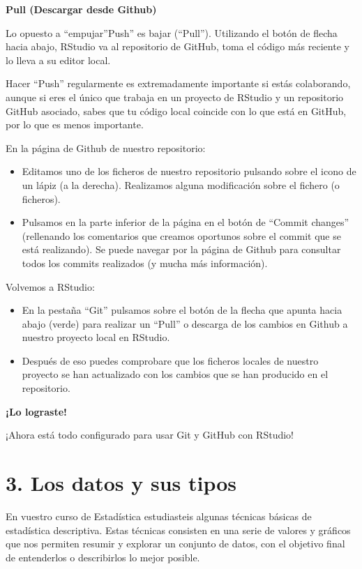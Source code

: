 \documentclass[
  letterpaper,
  DIV=11,
  numbers=noendperiod]{scrreprt}
\begin{document}
\textbf{Pull (Descargar desde Github)}

Lo opuesto a ``empujar''Push'' es bajar (``Pull''). Utilizando el botón
de flecha hacia abajo, RStudio va al repositorio de GitHub, toma el
código más reciente y lo lleva a su editor local.

Hacer ``Push'' regularmente es extremadamente importante si estás
colaborando, aunque si eres el único que trabaja en un proyecto de
RStudio y un repositorio GitHub asociado, sabes que tu código local
coincide con lo que está en GitHub, por lo que es menos importante.

En la página de Github de nuestro repositorio:

\begin{itemize}
\item
  Editamos uno de los ficheros de nuestro repositorio pulsando sobre el
  icono de un lápiz (a la derecha). Realizamos alguna modificación sobre
  el fichero (o ficheros).
\item
  Pulsamos en la parte inferior de la página en el botón de ``Commit
  changes'' (rellenando los comentarios que creamos oportunos sobre el
  commit que se está realizando). Se puede navegar por la página de
  Github para consultar todos los commits realizados (y mucha más
  información).
\end{itemize}

Volvemos a RStudio:

\begin{itemize}
\item
  En la pestaña ``Git'' pulsamos sobre el botón de la flecha que apunta
  hacia abajo (verde) para realizar un ``Pull'' o descarga de los
  cambios en Github a nuestro proyecto local en RStudio.
\item
  Después de eso puedes comprobare que los ficheros locales de nuestro
  proyecto se han actualizado con los cambios que se han producido en el
  repositorio.
\end{itemize}

\textbf{¡Lo lograste!}

¡Ahora está todo configurado para usar Git y GitHub con RStudio!

\hypertarget{los-datos-y-sus-tipos}{%
\section{3. Los datos y sus tipos}\label{los-datos-y-sus-tipos}}

En vuestro curso de Estadística estudiasteis algunas técnicas básicas de
estadística descriptiva. Estas técnicas consisten en una serie de
valores y gráficos que nos permiten resumir y explorar un conjunto de
datos, con el objetivo final de entenderlos o describirlos lo mejor
posible.
\end{document}
